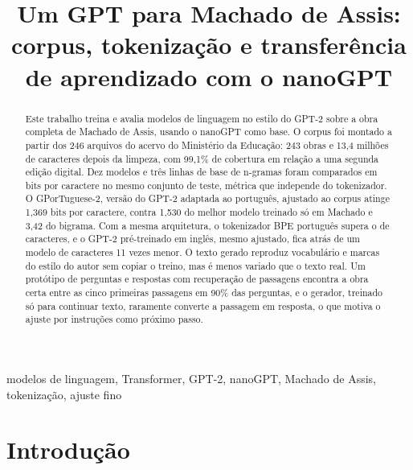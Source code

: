 \documentclass[conference]{IEEEtran}
\begin{document}
\title{Um GPT para Machado de Assis: corpus, tokenização e transferência de aprendizado com o nanoGPT}

\author{
}

\maketitle

\begin{abstract}
Este trabalho treina e avalia modelos de linguagem no estilo do GPT-2 sobre a obra completa de Machado de Assis, usando o nanoGPT como base. O corpus foi montado a partir dos 246 arquivos do acervo do Ministério da Educação: 243 obras e 13,4 milhões de caracteres depois da limpeza, com 99,1\% de cobertura em relação a uma segunda edição digital. Dez modelos e três linhas de base de n-gramas foram comparados em bits por caractere no mesmo conjunto de teste, métrica que independe do tokenizador. O GPorTuguese-2, versão do GPT-2 adaptada ao português, ajustado ao corpus atinge 1,369 bits por caractere, contra 1,530 do melhor modelo treinado só em Machado e 3,42 do bigrama. Com a mesma arquitetura, o tokenizador BPE português supera o de caracteres, e o GPT-2 pré-treinado em inglês, mesmo ajustado, fica atrás de um modelo de caracteres 11 vezes menor. O texto gerado reproduz vocabulário e marcas do estilo do autor sem copiar o treino, mas é menos variado que o texto real. Um protótipo de perguntas e respostas com recuperação de passagens encontra a obra certa entre as cinco primeiras passagens em 90\% das perguntas, e o gerador, treinado só para continuar texto, raramente converte a passagem em resposta, o que motiva o ajuste por instruções como próximo passo.
\end{abstract}

\begin{IEEEkeywords}
modelos de linguagem, Transformer, GPT-2, nanoGPT, Machado de Assis, tokenização, ajuste fino
\end{IEEEkeywords}

\section{Introdução}
\end{document}
